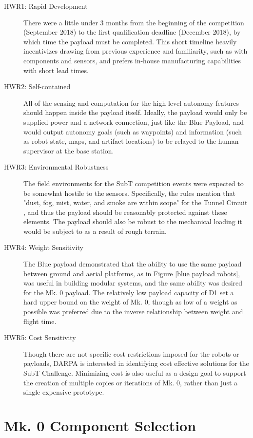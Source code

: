 \begin{description}
	\item[HWR1: Rapid Development] There were a little under 3 months from the beginning of the competition (September 2018) to the first qualification deadline (December 2018), by which time the payload must be completed. This short timeline heavily incentivizes drawing from previous experience and familiarity, such as with components and sensors, and prefers in-house manufacturing capabilities with short lead times.
	\item[HWR2: Self-contained] All of the sensing and computation for the high level autonomy features should happen inside the payload itself. Ideally, the payload would only be supplied power and a network connection, just like the Blue Payload, and would output autonomy goals (such as waypoints) and information (such as robot state, maps, and artifact locations) to be relayed to the human supervisor at the base station.
	\item[HWR3: Environmental Robustness] The field environments for the SubT competition events were expected to be somewhat hostile to the sensors. Specifically, the rules mention that "dust, fog, mist, water, and smoke are within scope" for the Tunnel Circuit \cite{tunnel_rules}, and thus the payload should be reasonably protected against these elements. The payload should also be robust to the mechanical loading it would be subject to as a result of rough terrain.
	\item[HWR4: Weight Sensitivity] The Blue payload demonstrated that the ability to use the same payload between ground and aerial platforms, as in Figure \ref{blue payload robots}, was useful in building modular systems, and the same ability was desired for the Mk. 0 payload. The relatively low payload capacity of D1 set a hard upper bound on the weight of Mk. 0, though as low of a weight as possible was preferred due to the inverse relationship between weight and flight time.	
	\item[HWR5: Cost Sensitivity] Though there are not specific cost restrictions imposed for the robots or payloads, DARPA is interested in identifying cost effective solutions for the SubT Challenge. Minimizing cost is also useful as a design goal to support the creation of multiple copies or iterations of Mk. 0, rather than just a single expensive prototype.
\end{description}

\section{Mk. 0 Component Selection}

